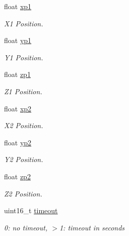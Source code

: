 \begin{DoxyCompactItemize}
\item 
float \hyperlink{struct____mavlink__point__of__interest__connection__t_a5fd92451f42437dcf273f9ddd4147c63}{xp1}
\begin{DoxyCompactList}\small\item\em X1 Position. \end{DoxyCompactList}\item 
float \hyperlink{struct____mavlink__point__of__interest__connection__t_afc54fe6545b6dba7ef435b63c7906224}{yp1}
\begin{DoxyCompactList}\small\item\em Y1 Position. \end{DoxyCompactList}\item 
float \hyperlink{struct____mavlink__point__of__interest__connection__t_a6d03d279549307bb96a80046fbc14865}{zp1}
\begin{DoxyCompactList}\small\item\em Z1 Position. \end{DoxyCompactList}\item 
float \hyperlink{struct____mavlink__point__of__interest__connection__t_afea2124862e1a23d400c3f544ea5b8a5}{xp2}
\begin{DoxyCompactList}\small\item\em X2 Position. \end{DoxyCompactList}\item 
float \hyperlink{struct____mavlink__point__of__interest__connection__t_aa9276316557e597aa3c333078e33b1a5}{yp2}
\begin{DoxyCompactList}\small\item\em Y2 Position. \end{DoxyCompactList}\item 
float \hyperlink{struct____mavlink__point__of__interest__connection__t_ae2b19b85b14cc560b2a815dd1c557074}{zp2}
\begin{DoxyCompactList}\small\item\em Z2 Position. \end{DoxyCompactList}\item 
uint16\+\_\+t \hyperlink{struct____mavlink__point__of__interest__connection__t_a44f8bd431ecbf9cb3978536f4e8c2679}{timeout}
\begin{DoxyCompactList}\small\item\em 0\+: no timeout, $>$1\+: timeout in seconds \end{DoxyCompactList}\item 

\end{DoxyCompactItemize}
